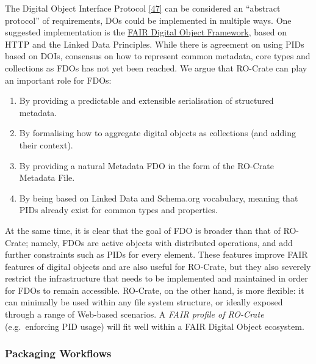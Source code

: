 The Digital Object Interface Protocol
\href{https://www.dona.net/sites/default/files/2018-11/DOIPv2Spec_1.pdf}{{[}47{]}}
can be considered an ``abstract protocol'' of requirements, DOs could be
implemented in multiple ways. One suggested implementation is the
\href{https://fairdigitalobjectframework.org/}{FAIR Digital Object
Framework}, based on HTTP and the Linked Data Principles. While there is
agreement on using PIDs based on DOIs, consensus on how to represent
common metadata, core types and collections as FDOs has not yet been
reached. We argue that RO-Crate can play an important role for FDOs:

\begin{enumerate}
\def\labelenumi{\arabic{enumi}.}
\tightlist
\item
  By providing a predictable and extensible serialisation of structured
  metadata.
\item
  By formalising how to aggregate digital objects as collections (and
  adding their context).
\item
  By providing a natural Metadata FDO in the form of the RO-Crate
  Metadata File.
\item
  By being based on Linked Data and Schema.org vocabulary, meaning that
  PIDs already exist for common types and properties.
\end{enumerate}

At the same time, it is clear that the goal of FDO is broader than that
of RO-Crate; namely, FDOs are active objects with distributed
operations, and add further constraints such as PIDs for every element.
These features improve FAIR features of digital objects and are also
useful for RO-Crate, but they also severely restrict the infrastructure
that needs to be implemented and maintained in order for FDOs to remain
accessible. RO-Crate, on the other hand, is more flexible: it can
minimally be used within any file system structure, or ideally exposed
through a range of Web-based scenarios. A \emph{FAIR profile of
RO-Crate} (e.g.~enforcing PID usage) will fit well within a FAIR Digital
Object ecosystem.

\hypertarget{packaging-workflows}{%
\subsubsection{Packaging Workflows}\label{packaging-workflows}}

